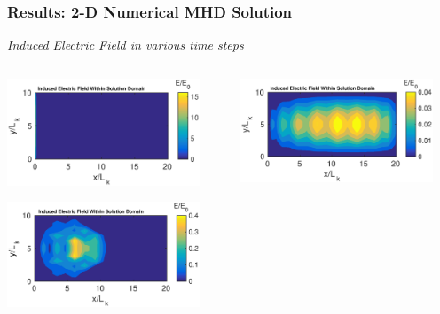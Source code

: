 \documentclass{fancyslides}
\begin{document}
\begin{frame}
 \frametitle{Results: 2-D Numerical MHD Solution}
 { \Large \emph{ \color{blue} Induced Electric Field in various time steps}}
\begin{columns}
\begin{column}{0.5\textwidth}
   \begin{center}
     \includegraphics[width=0.9\textwidth]{Ebeg.eps}
     \end{center}
 \begin{center}
     \includegraphics[width=0.9\textwidth]{Emid1.eps}
     \end{center}
\end{column}
\begin{column}{0.5\textwidth}  %
\begin{center}
     \includegraphics[width=0.9\textwidth]{Emid2.eps}

\end{center}
\end{column}
\end{columns}
\end{frame}
\end{document}
